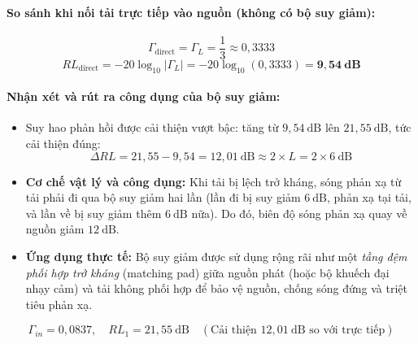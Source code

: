 \documentclass[12pt,a4paper]{article}
\begin{document}
\paragraph{So sánh khi nối tải trực tiếp vào nguồn (không có bộ suy giảm):}
\[
\Gamma_{\text{direct}} = \Gamma_L = \frac{1}{3} \approx 0{,}3333
\]
\[
RL_{\text{direct}} = -20 \log_{10} |\Gamma_L| = -20 \log_{10}(0{,}3333) = \mathbf{9{,}54~\text{dB}}
\]

\paragraph{Nhận xét và rút ra công dụng của bộ suy giảm:}
\begin{itemize}
    \item Suy hao phản hồi được cải thiện vượt bậc: tăng từ $9{,}54~\text{dB}$ lên $21{,}55~\text{dB}$, tức cải thiện đúng:
    \[
    \Delta RL = 21{,}55 - 9{,}54 = 12{,}01~\text{dB} \approx 2 \times L = 2 \times 6~\text{dB}
    \]
    \item \textbf{Cơ chế vật lý và công dụng:} Khi tải bị lệch trở kháng, sóng phản xạ từ tải phải đi qua bộ suy giảm hai lần (lần đi bị suy giảm $6~\text{dB}$, phản xạ tại tải, và lần về bị suy giảm thêm $6~\text{dB}$ nữa). Do đó, biên độ sóng phản xạ quay về nguồn giảm $12~\text{dB}$.
    \item \textbf{Ứng dụng thực tế:} Bộ suy giảm được sử dụng rộng rãi như một \textit{tầng đệm phối hợp trở kháng} (matching pad) giữa nguồn phát (hoặc bộ khuếch đại nhạy cảm) và tải không phối hợp để bảo vệ nguồn, chống sóng đứng và triệt tiêu phản xạ.
\end{itemize}
\[
\boxed{\Gamma_{in} = 0{,}0837, \quad RL_1 = 21{,}55~\text{dB} \quad (\text{Cải thiện } 12{,}01~\text{dB} \text{ so với trực tiếp})}
\]
\end{document}
